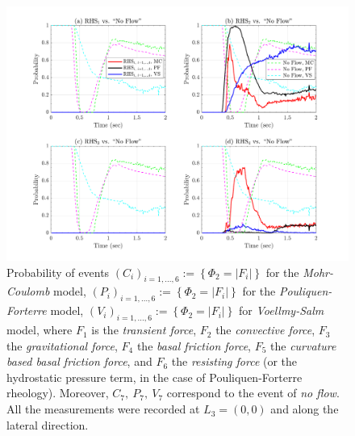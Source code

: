 \documentclass{article}
\begin{document}
\begin{figure}[H]
        \centering
        \includegraphics[width=1\textwidth]{InclinedPlane/Dominance1/DominancePrY_L3.png}
        \caption{Probability of events $(C_i)_{i=1,...,6}:=\left\{\Phi_2=|F_i|\right\}$ for the \emph{Mohr-Coulomb} model, $(P_i)_{i=1,...,6}:=\left\{\Phi_2=|F_i|\right\}$ for the \emph{Pouliquen-Forterre} model, $(V_i)_{i=1,...,6}:=\left\{\Phi_2=|F_i|\right\}$ for \emph{Voellmy-Salm} model, where $F_1$ is the \emph{transient force}, $F_2$ the \emph{convective force}, $F_3$ the \emph{gravitational force}, $F_4$ the \emph{basal friction force}, $F_5$ the \emph{curvature based basal friction force}, and $F_6$ the \emph{resisting force} (or the hydrostatic pressure term, in the case of Pouliquen-Forterre rheology). Moreover, $C_7,\ P_7,\ V_7$ correspond to the event of \emph{no flow}. All the measurements were recorded at $L_3=(0,0)$ and along the lateral direction.}
        \label{fig:Ramp-FYDominance1-L3}
\end{figure}
\end{document}
